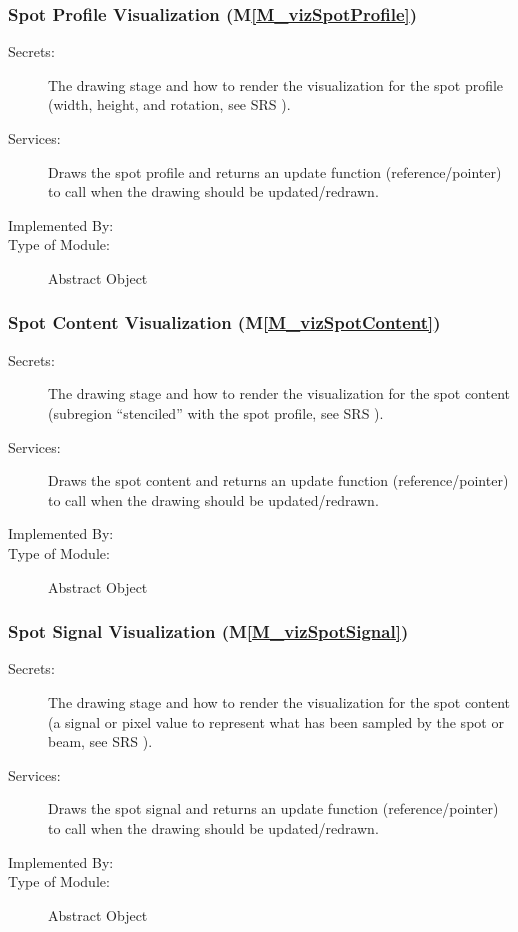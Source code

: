 \documentclass[12pt, titlepage]{article}
\newcommand{\mref}[1]{M\ref{#1}}
\begin{document}
\subsubsection{Spot Profile Visualization (\mref{M_vizSpotProfile})}
\begin{description}
\item[Secrets:] The drawing stage and how to render the visualization for the
  spot profile (width, height, and rotation, see SRS \cite{SRS}).
\item[Services:] Draws the spot profile and returns an update function (reference/pointer)
  to call when the drawing should be updated/redrawn.
\item[Implemented By:] \progname{}
\item[Type of Module:] Abstract Object
\end{description}


\subsubsection{Spot Content Visualization (\mref{M_vizSpotContent})}
\begin{description}
\item[Secrets:] The drawing stage and how to render the visualization for the
  spot content (subregion ``stenciled'' with the spot profile, see SRS \cite{SRS}).
\item[Services:] Draws the spot content and returns an update function (reference/pointer)
  to call when the drawing should be updated/redrawn.
\item[Implemented By:] \progname{}
\item[Type of Module:] Abstract Object
\end{description}


\subsubsection{Spot Signal Visualization (\mref{M_vizSpotSignal})}
\begin{description}
\item[Secrets:] The drawing stage and how to render the visualization for the
  spot content (a signal or pixel value to represent what has been sampled by
  the spot or beam, see SRS \cite{SRS}).
\item[Services:] Draws the spot signal and returns an update function (reference/pointer)
  to call when the drawing should be updated/redrawn.
\item[Implemented By:] \progname{}
\item[Type of Module:] Abstract Object
\end{description}
\end{document}
